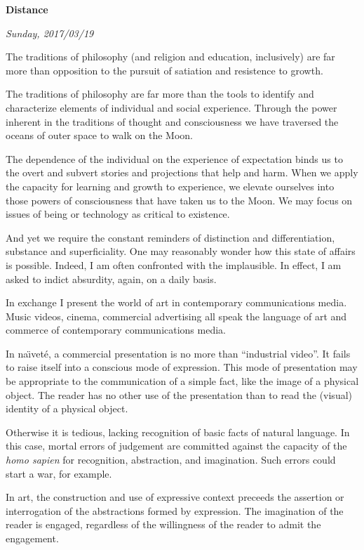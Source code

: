 

\centerline{\bf Distance}
\centerline{\it Sunday, 2017/03/19}



\vfill
\break



The traditions of philosophy (and religion and education, inclusively)
are far more than opposition to the pursuit of satiation and
resistence to growth.  

The traditions of philosophy are far more than the tools to identify
and characterize elements of individual and social experience.
Through the power inherent in the traditions of thought and
consciousness we have traversed the oceans of outer space to walk on
the Moon.

The dependence of the individual on the experience of expectation
binds us to the overt and subvert stories and projections that help
and harm.  When we apply the capacity for learning and growth to
experience, we elevate ourselves into those powers of consciousness
that have taken us to the Moon.  We may focus on issues of being or
technology as critical to existence.  

And yet we require the constant reminders of distinction and
differentiation, substance and superficiality.  One may reasonably
wonder how this state of affairs is possible.  Indeed, I am often
confronted with the implausible.  In effect, I am asked to indict
absurdity, again, on a daily basis.

In exchange I present the world of art in contemporary communications
media.  Music videos, cinema, commercial advertising all speak the
language of art and commerce of contemporary communications media.  

In na\"{\i}vet\'{e}, a commercial presentation is no more than
``industrial video''.  It fails to raise itself into a conscious mode
of expression.  This mode of presentation may be appropriate to the
communication of a simple fact, like the image of a physical object.
The reader has no other use of the presentation than to read the
(visual) identity of a physical object.

Otherwise it is tedious, lacking recognition of basic facts of natural
language.  In this case, mortal errors of judgement are committed
against the capacity of the {\it homo sapien} for recognition,
abstraction, and imagination.  Such errors could start a war, for
example.

In art, the construction and use of expressive context preceeds the
assertion or interrogation of the abstractions formed by expression.
The imagination of the reader is engaged, regardless of the
willingness of the reader to admit the engagement.  

